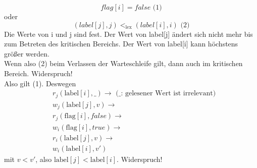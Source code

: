 \begin{equation*}
	flag[i] = false \text{ (1)}
\end{equation*}
oder
\begin{equation*}
	\left(label[j], j\right) <_\text{lex} \left(label[i], i\right) \text{ (2)}
\end{equation*}
Die Werte von i und j sind fest. Der Wert von label[j] ändert sich nicht mehr bis zum Betreten des kritischen Bereichs. Der Wert von label[i] kann höchstens größer werden.\\
Wenn also (2) beim Verlassen der Warteschleife gilt, dann auch im kritischen Bereich. Widerspruch!\\
Also gilt (1). Deswegen 
\begin{align*}
&	r_j\left(\text{label}[i], \_\right) \rightarrow \text{ (\_: gelesener Wert ist irrelevant)}\\
&	w_j\left(\text{label}[j], v\right) \rightarrow\\
&	r_j\left(\text{flag}[i], false\right) \rightarrow\\
&	w_i\left(\text{flag}[i], true\right) \rightarrow\\
&	r_i\left(\text{label}[j], v\right) \rightarrow\\
&	w_i\left(\text{label}[i], v'\right)
\end{align*}
mit $v < v'$, also $\text{label}[j] < \text{label}[i]$. Widerspruch!